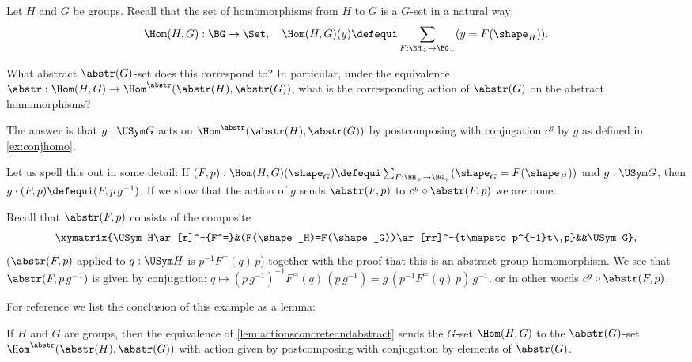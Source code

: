 \begin{example}
  \label{ex:abstrandconj}
  Let $H$ and $G$ be groups.  Recall that the set of homomorphisms from $H$ to $G$ is a $G$-set in a natural way:
$$\Hom(H,G):\BG\to\Set,\quad \Hom(H,G)(y)\defequi \sum_{F:\BH_\div\to \BG_\div}(y=F(\shape_H)).$$

What abstract $\abstr(G)$-set does this correspond to?
In particular, under the equivalence $\abstr:\Hom(H,G)\to\Hom^\abstr(\abstr(H),\abstr(G))$, what is the corresponding action of $\abstr(G)$ on the abstract homomorphisms?

The answer is that $g:\USym G$ acts on $\Hom^\abstr(\abstr(H),\abstr(G))$ by postcomposing with conjugation $c^g$ by $g$ as defined in \cref{ex:conjhomo}.

Let us spell this out in some detail:
If $(F,p):\Hom(H,G)(\shape_G)\defequi
 \sum_{F:\BH_\div\to \BG_\div}(\shape_G=F(\shape_H))$ and $g:\USym G$, then $g\cdot(F,p)\defequi(F,p\,g^{-1})$.  If we show that the action of $g$ sends $\abstr(F,p)$ to $c^g\circ\abstr(F,p)$ we are done.

Recall that $\abstr(F,p)$ consists of the composite
$$\xymatrix{\USym H\ar[r]^-{F^=}&(F(\shape_H)=F(\shape_G))\ar[rr]^-{t\mapsto p^{-1}t\,p}&&\USym G},$$
(\ie $\abstr(F,p)$ applied to $q:\USym H $ is  $p^{-1}F^=(q)\,p$)  together with the proof that this is an abstract group homomorphism.
We see that $\abstr(F,p\,g^{-1})$ is given by conjugation:
$q\mapsto(p\,g^{-1})^{-1}F^=(q)\,(p\,g^{-1})=g\,(p^{-1}F^=(q)\,p)\,g^{-1}$, or in other words $c^g\circ\abstr(F,p)$.
\end{example}
For reference we list the conclusion of this example as a lemma:
\begin{lemma}\label{lem:abstrandconj}
  If $H$ and $G$ are groups, then the equivalence of \cref{lem:actionsconcreteandabstract} sends the $G$-set $\Hom(H,G)$ to the $\abstr(G)$-set $\Hom^\abstr(\abstr(H),\abstr(G))$ with action given by postcomposing with conjugation by elements of $\abstr(G)$.
\end{lemma}

